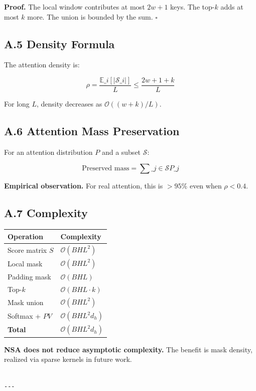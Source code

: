 \textbf{Proof.} The local window contributes at most $2w + 1$ keys. The top-$k$ 
adds at most $k$ more. The union is bounded by the sum. $\square$

\subsection{A.5 Density Formula}

The attention density is:

\[
\rho = \frac{\mathbb{E}\_i[|\mathcal{S}\_i|]}{L} \leq \frac{2w + 1 + k}{L}
\tag{A.2}
\]

For long $L$, density decreases as $\mathcal{O}((w + k) / L)$.

\subsection{A.6 Attention Mass Preservation}

For an attention distribution $P$ and a subset $\mathcal{S}$:

\[
\text{Preserved mass} = \sum\_{j \in \mathcal{S}} P\_j
\tag{A.3}
\]

\textbf{Empirical observation.} For real attention, this is $> 95\%$ even when 
$\rho < 0.4$.

\subsection{A.7 Complexity}

\begin{table}[H]
\centering
\small
\begin{tabular}{ll}
\toprule
\textbf{Operation} & \textbf{Complexity} \\
\midrule
Score matrix $S$ & $\mathcal{O}(B H L^2)$ \\
Local mask & $\mathcal{O}(B H L^2)$ \\
Padding mask & $\mathcal{O}(B H L)$ \\
Top-$k$ & $\mathcal{O}(B H L \cdot k)$ \\
Mask union & $\mathcal{O}(B H L^2)$ \\
Softmax + $P V$ & $\mathcal{O}(B H L^2 d_h)$ \\
\textbf{Total} & $\mathcal{O}(B H L^2 d_h)$ \\
\bottomrule
\end{tabular}
\end{table}

\textbf{NSA does not reduce asymptotic complexity.} The benefit is mask density, 
realized via sparse kernels in future work.
\begin{lstlisting}

---
\end{lstlisting}


